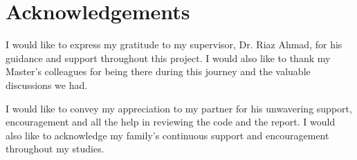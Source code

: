 \chapter*{Acknowledgements} 

I would like to express my gratitude to my supervisor, Dr. Riaz Ahmad, for his guidance and support throughout this project. I would also like to thank my Master's colleagues for being there during this journey and the valuable discussions we had.

I would like to convey my appreciation to my partner for his unwavering support, encouragement and all the help in reviewing the code and the report. I would also like to acknowledge my family's continuous support and encouragement throughout my studies.